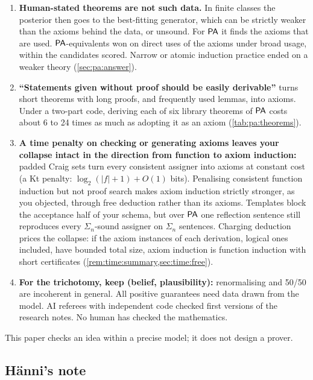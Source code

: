 \begin{framed}
\begin{enumerate}[label=\arabic*.,leftmargin=*,itemsep=0.5pt,topsep=1pt]
\item \textbf{Human-stated theorems are not such data.} In finite classes the posterior then goes to the best-fitting generator, which can be strictly weaker than the axioms behind the data, or unsound. For $\mathsf{PA}$ it finds the axioms that are used. $\mathsf{PA}$-equivalents won on direct uses of the axioms under broad usage, within the candidates scored. Narrow or atomic induction practice ended on a weaker theory (\cref{sec:pa:answer}).
\item \textbf{``Statements given without proof should be easily derivable''} turns short theorems with long proofs, and frequently used lemmas, into axioms. Under a two-part code, deriving each of six library theorems of $\mathsf{PA}$ costs about 6 to 24 times as much as adopting it as an axiom (\cref{tab:pa:theorems}).
\item \textbf{A time penalty on checking or generating axioms leaves your collapse intact in the direction from function to axiom induction:} padded Craig sets turn every consistent assigner into axioms at constant cost (a Kt penalty: $\log_2(|f|+1)+O(1)$ bits). Penalising consistent function induction but not proof search makes axiom induction strictly stronger, as you objected, through free deduction rather than its axioms. Templates block the acceptance half of your schema, but over $\mathsf{PA}$ one reflection sentence still reproduces every $\Sigma_n$-sound assigner on $\Sigma_n$ sentences. Charging deduction prices the collapse: if the axiom instances of each derivation, logical ones included, have bounded total size, axiom induction is function induction with short certificates (\cref{rem:time:summary,sec:time:free}).
\item \textbf{For the trichotomy, keep (belief, plausibility):} renormalising and 50/50 are incoherent in general. All positive guarantees need data drawn from the model. AI referees with independent code checked first versions of the research notes. No human has checked the mathematics.
\end{enumerate}
\end{framed}

This paper checks an idea within a precise model; it does not design a prover.

\subsection{H\"anni's note}\label{sec:intro:note}

